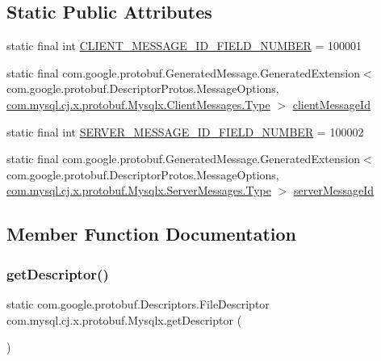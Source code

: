 \subsection*{Static Public Attributes}
\begin{DoxyCompactItemize}
\item 
static final int \mbox{\hyperlink{classcom_1_1mysql_1_1cj_1_1x_1_1protobuf_1_1_mysqlx_a2b5009d9317fab5353083025222397dc}{C\+L\+I\+E\+N\+T\+\_\+\+M\+E\+S\+S\+A\+G\+E\+\_\+\+I\+D\+\_\+\+F\+I\+E\+L\+D\+\_\+\+N\+U\+M\+B\+ER}} = 100001
\item 
static final com.\+google.\+protobuf.\+Generated\+Message.\+Generated\+Extension$<$ com.\+google.\+protobuf.\+Descriptor\+Protos.\+Message\+Options, \mbox{\hyperlink{enumcom_1_1mysql_1_1cj_1_1x_1_1protobuf_1_1_mysqlx_1_1_client_messages_1_1_type}{com.\+mysql.\+cj.\+x.\+protobuf.\+Mysqlx.\+Client\+Messages.\+Type}} $>$ \mbox{\hyperlink{classcom_1_1mysql_1_1cj_1_1x_1_1protobuf_1_1_mysqlx_a51cf8a943a8b670b469c2ec2726222a0}{client\+Message\+Id}}
\item 
static final int \mbox{\hyperlink{classcom_1_1mysql_1_1cj_1_1x_1_1protobuf_1_1_mysqlx_aa7289b91ec6f2fb3f9094f456796995c}{S\+E\+R\+V\+E\+R\+\_\+\+M\+E\+S\+S\+A\+G\+E\+\_\+\+I\+D\+\_\+\+F\+I\+E\+L\+D\+\_\+\+N\+U\+M\+B\+ER}} = 100002
\item 
static final com.\+google.\+protobuf.\+Generated\+Message.\+Generated\+Extension$<$ com.\+google.\+protobuf.\+Descriptor\+Protos.\+Message\+Options, \mbox{\hyperlink{enumcom_1_1mysql_1_1cj_1_1x_1_1protobuf_1_1_mysqlx_1_1_server_messages_1_1_type}{com.\+mysql.\+cj.\+x.\+protobuf.\+Mysqlx.\+Server\+Messages.\+Type}} $>$ \mbox{\hyperlink{classcom_1_1mysql_1_1cj_1_1x_1_1protobuf_1_1_mysqlx_aa80c35e06003c6b88c27f1dc6284db4b}{server\+Message\+Id}}
\end{DoxyCompactItemize}


\subsection{Member Function Documentation}
\mbox{\label{classcom_1_1mysql_1_1cj_1_1x_1_1protobuf_1_1_mysqlx_a5fc24d044e64d8e06e049b4a4bfae2f2}} 
\subsubsection{\texorpdfstring{get\+Descriptor()}{getDescriptor()}}
{\footnotesize\ttfamily static com.\+google.\+protobuf.\+Descriptors.\+File\+Descriptor com.\+mysql.\+cj.\+x.\+protobuf.\+Mysqlx.\+get\+Descriptor (\begin{DoxyParamCaption}{ }\end{DoxyParamCaption})\hspace{0.3cm}{\ttfamily [static]}}

